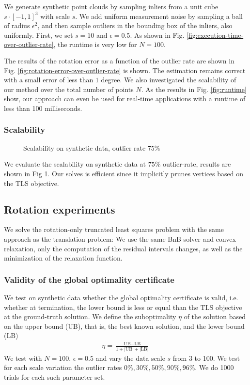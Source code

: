 We generate synthetic point clouds by sampling inliers from a unit cube $s \cdot [-1, 1]^3$ with scale $s$. We add uniform measurement noise by sampling a ball of radius $\epsilon^2$, and then sample outliers in the bounding box of the inliers, also uniformly. First, we set $s=10$ and $\epsilon=0.5$. As shown in Fig. \ref{fig:execution-time-over-outlier-rate}, the runtime is very low for $N =100$.

The results of the rotation error as a function of the outlier rate are shown in Fig. \ref{fig:rotation-error-over-outlier-rate} is shown. The estimation remains correct with a small error of less than $1$ degree. We also investigated the scalability of our method over the total number of points $N$. As the results in Fig. \ref{fig:runtime} show, our approach can even be used for real-time applications with a runtime of less than 100 milliseconds.

\subsubsection{Scalability}
\begin{figure}[!ht]
	\centering
	\caption{Scalability on synthetic data, outlier rate $75\%$}
	\label{fig:execution-time-over-n}
\end{figure}

We evaluate the scalability on synthetic data at $75\%$ outlier-rate, results are shown in Fig \ref{fig:execution-time-over-n}. Our solves is efficient since it implicitly prunes vertices based on the TLS objective.

\subsection{Rotation experiments}
We solve the rotation-only truncated least squares problem with the same approach as the translation problem: We use the same BnB solver and convex relaxation, only the computation of the residual intervals changes, as well as the minimization of the relaxation function.


\subsubsection{Validity of the global optimality certificate}
We test on synthetic data whether the global optimality certificate is valid, i.e. whether at termination, the lower bound is less or equal than the TLS objective at the ground-truth solution.
We define the suboptimality $\eta$ of the solution based on the upper bound (UB), that is, the best known solution, and the lower bound (LB) \cite{9785843}
\begin{equation}
	\begin{aligned}    
		\eta = \frac{\text{UB} - \text{LB}}{1 + |\text{UB}| + |\text{LB}|}
	\end{aligned}
\end{equation}
We test with $N=100$, $\epsilon=0.5$ and vary the data scale $s$ from 3 to 100. We test for each scale variation the outlier rates $0\%, 30\%, 50\%, 90\%, 96\%$. We do 1000 trials for each such parameter set.

